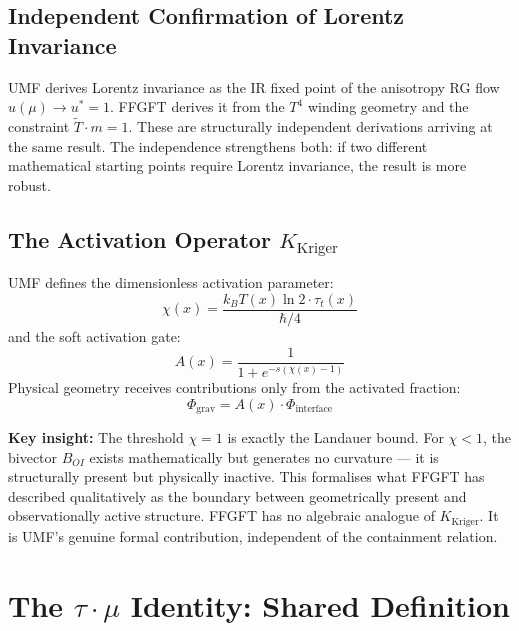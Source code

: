 \subsection{Independent Confirmation of Lorentz Invariance}

UMF derives Lorentz invariance as the IR fixed point of the anisotropy RG
flow $u(\mu) \to u^* = 1$. FFGFT derives it from the $T^4$ winding geometry
and the constraint $\tilde{T}\cdot m = 1$. These are structurally independent
derivations arriving at the same result. The independence strengthens both:
if two different mathematical starting points require Lorentz invariance,
the result is more robust.

\subsection{The Activation Operator \texorpdfstring{$K_\text{Kriger}$}{K\_Kriger}}
\label{sec:kriger}

UMF defines the dimensionless activation parameter:
\begin{equation}
  \chi(x) = \frac{k_B T(x)\ln 2 \cdot \tau_t(x)}{\hbar/4}
  \tag{244.6a}
\end{equation}
and the soft activation gate:
\begin{equation}
  A(x) = \frac{1}{1+e^{-s(\chi(x)-1)}}
  \tag{244.6b}
\end{equation}
Physical geometry receives contributions only from the activated fraction:
\begin{equation}
  \Phi_\text{grav} = A(x) \cdot \Phi_\text{interface}
  \tag{244.6c}
\end{equation}

\textbf{Key insight:} The threshold $\chi = 1$ is exactly the Landauer bound.
For $\chi < 1$, the bivector $B_{OI}$ exists mathematically but generates no
curvature — it is structurally present but physically inactive. This formalises
what FFGFT has described qualitatively as the boundary between geometrically
present and observationally active structure. FFGFT has no algebraic analogue
of $K_\text{Kriger}$. It is UMF's genuine formal contribution, independent
of the containment relation.

\section{\texorpdfstring{The $\tau\cdot\mu$ Identity}{The tau.mu Identity}: Shared Definition}

